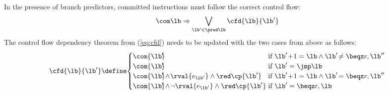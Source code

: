 \documentclass[conference]{IEEEtran}
\begin{document}
In the presence of branch predictors, committed instructions must follow the correct control flow:
\begin{equation}
{\com \lb} \Rightarrow {\bigvee\limits_{{\lb'} \in \pred \lb} \cfd{\lb}{\lb'}} \nonumber
\end{equation}
The control flow dependency theorem from (\ref{eq:cfd}) needs to be updated with the two cases from above as follows:
{\small
\[   
\cfd{\lb}{\lb'} \define \!
     \begin{cases}
       \com{\lb'\!\!} & \hspace*{-2.5mm}\text{if } \lb' \! + \! 1 = \lb \land \lb' \!\neq \beqz r,\lb'' \\
       \com{\lb'\!\!} & \hspace*{-2.5mm}\text{if } \lb' = \jmp \lb \\
       {\com{\lb'\!\!} \!\land\! \rval{e_{\lb'}}} \land {\red \cp{\lb'}} & \hspace*{-2.5mm}\text{if } \lb' \! + \! 1 = \lb \land \lb' \!= \beqz r,\lb'' \\
       {\com{\lb'\!\!} \!\land\! {\neg \rval{e_{\lb'}}}} \land {\red \cp{\lb'}} & \hspace*{-2.5mm}\text{if } \lb' = \beqz r,\lb \\
     \end{cases}
\]}
\end{document}
